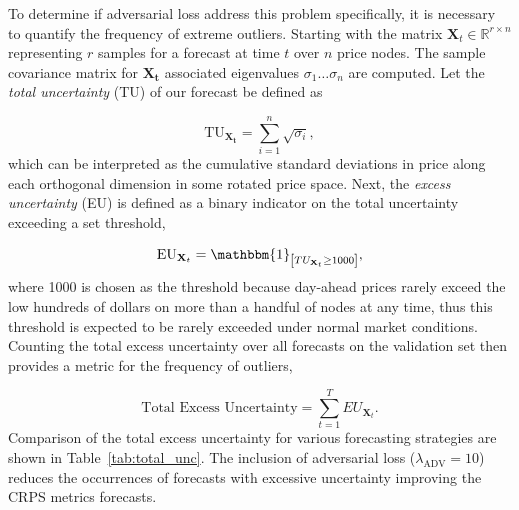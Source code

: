 To determine if adversarial loss address this problem specifically, it is necessary to quantify the frequency of extreme
outliers.
Starting with the matrix $\mathbf{X}_t \in \mathbb{R}^{r \times n}$ representing $r$ samples for a forecast at time
$t$ over $n$ price nodes.
The sample covariance matrix for $\mathbf{X_t}$ associated eigenvalues ${\sigma_1 \dots \sigma_n}$ are computed.
Let the \textit{total uncertainty} (TU) of our forecast be defined as

\begin{equation*}
    \text{TU}_\mathbf{X_t} = \sum_{i=1}^{n} \sqrt{\sigma_i},
    \label{eq:total_uncertainty}
\end{equation*}
which can be interpreted as the cumulative standard deviations in price along each orthogonal dimension in some rotated
price space.
Next, the \textit{excess uncertainty} (EU) is defined as a binary indicator on the total uncertainty exceeding a set
threshold,

\begin{equation*}
    \text{EU}_{\mathbf{X}_t} = \mathbbm{1}_{\left[ TU_{\mathbf{X}_t} \geq 1000 \right]},
    \label{eq:excess_unc}
\end{equation*}
where 1000 is chosen as the threshold because day-ahead prices rarely exceed the low hundreds of dollars on more than a
handful of nodes at any time, thus this threshold is expected to be rarely exceeded under normal market conditions.
Counting the total excess uncertainty over all forecasts on the validation set then provides a metric for the
frequency of outliers,

\begin{equation*}
    \text{Total Excess Uncertainty} = \sum_{t=1}^{T} EU_{\textbf{X}_t}.
    \label{eq:total_unc}
\end{equation*}
Comparison of the total excess uncertainty for various forecasting strategies are shown in Table~\ref{tab:total_unc}.
The inclusion of adversarial loss ($\lambda_{\text{ADV}} = 10$) reduces the occurrences of forecasts with excessive
uncertainty improving the CRPS metrics forecasts.

